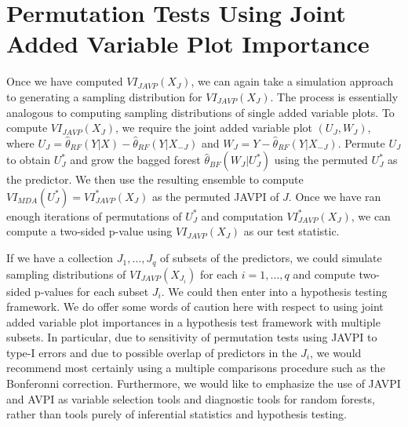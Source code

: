 \documentclass[12pt,twoside]{reedthesis}
\theoremstyle{definition}
\theoremstyle{definition}
\theoremstyle{definition}
\theoremstyle{remark}
\begin{document}
\section{Permutation Tests Using Joint Added Variable Plot
Importance}\label{permutation-tests-using-joint-added-variable-plot-importance}

Once we have computed \(VI_{JAVP}(X_J)\), we can again take a simulation
approach to generating a sampling distribution for \(VI_{JAVP}(X_J)\).
The process is essentially analogous to computing sampling distributions
of single added variable plots. To compute \(VI_{JAVP}(X_J)\), we
require the joint added variable plot \((U_J,W_J)\), where
\(U_J=\hat{\theta}_{RF}(Y|X)-\hat{\theta}_{RF}(Y|X_{-J})\) and
\(W_J=Y-\hat{\theta}_{RF}(Y|X_{-J})\). Permute \(U_J\) to obtain
\(U_J^*\) and grow the bagged forest \(\hat{\theta}_{BF}(W_J|U_J^*)\)
using the permuted \(U_J^*\) as the predictor. We then use the resulting
ensemble to compute \(VI_{MDA}(U_J^*)=VI_{JAVP}^*(X_J)\) as the permuted
JAVPI of \(J\). Once we have ran enough iterations of permutations of
\(U_J^*\) and computation \(VI_{JAVP}^*(X_J)\), we can compute a
two-sided p-value using \(VI_{JAVP}(X_J)\) as our test statistic.

If we have a collection \(J_1,\ldots, J_q\) of subsets of the
predictors, we could simulate sampling distributions of
\(VI_{JAVP}(X_{J_i})\) for each \(i=1,\ldots,q\) and compute two-sided
p-values for each subset \(J_i\). We could then enter into a hypothesis
testing framework. We do offer some words of caution here with respect
to using joint added variable plot importances in a hypothesis test
framework with multiple subsets. In particular, due to sensitivity of
permutation tests using JAVPI to type-I errors and due to possible
overlap of predictors in the \(J_i\), we would recommend most certainly
using a multiple comparisons procedure such as the Bonferonni
correction. Furthermore, we would like to emphasize the use of JAVPI and
AVPI as variable selection tools and diagnostic tools for random
forests, rather than tools purely of inferential statistics and
hypothesis testing.
\end{document}

